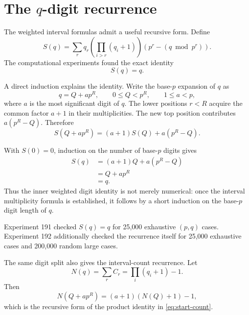\documentclass[11pt,a4paper]{article}
\theoremstyle{definition}
\theoremstyle{remark}
\begin{document}
\section{The $q$-digit recurrence}

The weighted interval formulas admit a useful recursive form. Define
\begin{equation}
 S(q)=
 \sum_r
 q_r\left(\prod_{i>r}(q_i+1)\right)
 \left(p^r-(q\bmod p^r)\right).
 \label{eq:S-def}
\end{equation}
The computational experiments found the exact identity
\begin{equation}
 \boxed{S(q)=q}.
 \label{eq:S-q}
\end{equation}

A direct induction explains the identity. Write the base-$p$ expansion of $q$ as
\begin{equation}
 q=Q+ap^R,
 \qquad 0\le Q<p^R,
 \qquad 1\le a<p,
 \label{eq:q-split}
\end{equation}
where $a$ is the most significant digit of $q$. The lower positions $r<R$ acquire the common factor $a+1$ in their multiplicities. The new top position contributes $a(p^R-Q)$. Therefore
\begin{equation}
 S(Q+ap^R)=(a+1)S(Q)+a(p^R-Q).
 \label{eq:S-recurrence}
\end{equation}

With $S(0)=0$, induction on the number of base-$p$ digits gives
\begin{align}
 S(q)
 &= (a+1)Q+a(p^R-Q)\\
 &=Q+ap^R\\
 &=q.
 \label{eq:S-induction}
\end{align}
Thus the inner weighted digit identity is not merely numerical: once the interval multiplicity formula is established, it follows by a short induction on the base-$p$ digit length of $q$.

Experiment 191 checked $S(q)=q$ for 25,000 exhaustive $(p,q)$ cases. Experiment 192 additionally checked the recurrence itself for 25,000 exhaustive cases and 200,000 random large cases.

The same digit split also gives the interval-count recurrence. Let
\begin{equation}
 N(q)=\sum_r C_r=\prod_i(q_i+1)-1.
 \label{eq:N-def}
\end{equation}
Then
\begin{equation}
 N(Q+ap^R)=(a+1)(N(Q)+1)-1,
 \label{eq:N-recurrence}
\end{equation}
which is the recursive form of the product identity in \eqref{eq:start-count}.
\end{document}

